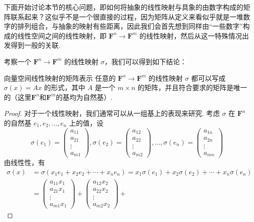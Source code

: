 下面开始讨论本节的核心问题，即如何将抽象的线性映射与具象的由数字构成的矩阵联系起来？这似乎不是一个很直接的过程，因为矩阵从定义来看似乎就是一堆数字的排列组合，与抽象的映射有些距离，因此我们会首先想到同样由``一些数字''构成的线性空间之间的线性映射，即 $\mathbf{F}^n \to \mathbf{F}^m$ 的线性映射，然后从这一特殊情况出发得到一般的关联.

考察一个 $\mathbf{F}^n \to \mathbf{F}^m$ 的线性映射 $\sigma$，我们可以得到如下结论：
\begin{lemma}{}{向量空间线性映射的矩阵表示}
    任意的 $\mathbf{F}^n \to \mathbf{F}^m$ 的线性映射 $\sigma$ 都可以写成 $\sigma(x) = Ax$ 的形式，其中 $A$ 是一个 $m \times n$ 的矩阵，并且符合要求的矩阵是唯一的（这里$\mathbf{F}^n$和$\mathbf{F}^m$的基均为自然基）.
\end{lemma}

\begin{proof}
    对于一个线性映射，我们通常可以从一组基上的表现来研究. 考虑 $\sigma$ 在 $\mathbf{F}^n$ 的自然基 $e_1, e_2, \ldots, e_n$ 上的值，设
    \[
        \sigma(e_1) = \begin{pmatrix} a_{11} \\ a_{21} \\ \vdots \\ a_{m1} \end{pmatrix},
        \sigma(e_2) = \begin{pmatrix} a_{12} \\ a_{22} \\ \vdots \\ a_{m2} \end{pmatrix},
        \ldots,
        \sigma(e_n) = \begin{pmatrix} a_{1n} \\ a_{2n} \\ \vdots \\ a_{mn} \end{pmatrix}
    \]
    由线性性，有
    \begin{align*}
        \sigma(x) &= \sigma(x_1 e_1 + x_2 e_2 + \cdots + x_n e_n) = x_1 \sigma(e_1) + x_2 \sigma(e_2) + \cdots + x_n \sigma(e_n) \\
        &= \begin{pmatrix} a_{11} x_1 \\ a_{21} x_1 \\ \vdots \\ a_{m1} x_1 \end{pmatrix} +
        \begin{pmatrix} a_{12} x_2 \\ a_{22} x_2 \\ \vdots \\ a_{m2} x_2 \end{pmatrix} +

\end{align*}
\end{proof}
